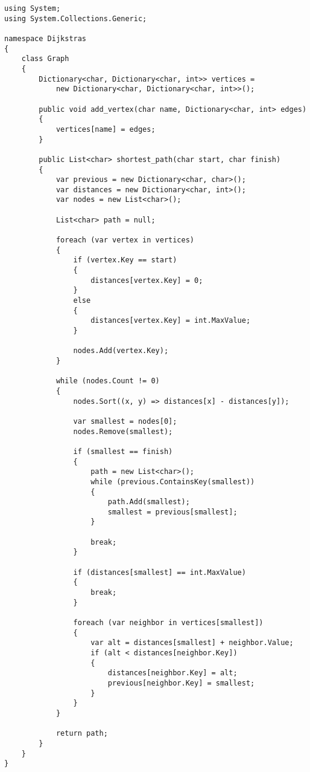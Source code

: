 \begin{lstlisting}
using System;
using System.Collections.Generic;

namespace Dijkstras
{
    class Graph
    {
        Dictionary<char, Dictionary<char, int>> vertices =
            new Dictionary<char, Dictionary<char, int>>();

        public void add_vertex(char name, Dictionary<char, int> edges)
        {
            vertices[name] = edges;
        }

        public List<char> shortest_path(char start, char finish)
        {
            var previous = new Dictionary<char, char>();
            var distances = new Dictionary<char, int>();
            var nodes = new List<char>();

            List<char> path = null;

            foreach (var vertex in vertices)
            {
                if (vertex.Key == start)
                {
                    distances[vertex.Key] = 0;
                }
                else
                {
                    distances[vertex.Key] = int.MaxValue;
                }

                nodes.Add(vertex.Key);
            }

            while (nodes.Count != 0)
            {
                nodes.Sort((x, y) => distances[x] - distances[y]);

                var smallest = nodes[0];
                nodes.Remove(smallest);

                if (smallest == finish)
                {
                    path = new List<char>();
                    while (previous.ContainsKey(smallest))
                    {
                        path.Add(smallest);
                        smallest = previous[smallest];
                    }

                    break;
                }

                if (distances[smallest] == int.MaxValue)
                {
                    break;
                }

                foreach (var neighbor in vertices[smallest])
                {
                    var alt = distances[smallest] + neighbor.Value;
                    if (alt < distances[neighbor.Key])
                    {
                        distances[neighbor.Key] = alt;
                        previous[neighbor.Key] = smallest;
                    }
                }
            }

            return path;
        }
    }
}
\end{lstlisting}